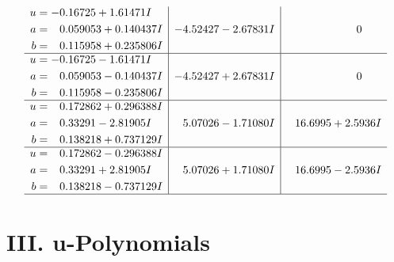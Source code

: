 \documentclass[1p]{elsarticle_modified}
\theoremstyle{definition}
\begin{document}
$$\begin{array}{c|c|c}
\begin{aligned}
u &= -0.16725 + 1.61471 I \\
a &= \phantom{-}0.059053 + 0.140437 I \\
b &= \phantom{-}0.115958 + 0.235806 I\end{aligned}
 & -4.52427 - 2.67831 I & \phantom{-0.000000 } 0 \\ \hline\begin{aligned}
u &= -0.16725 - 1.61471 I \\
a &= \phantom{-}0.059053 - 0.140437 I \\
b &= \phantom{-}0.115958 - 0.235806 I\end{aligned}
 & -4.52427 + 2.67831 I & \phantom{-0.000000 } 0 \\ \hline\begin{aligned}
u &= \phantom{-}0.172862 + 0.296388 I \\
a &= \phantom{-}0.33291 - 2.81905 I \\
b &= \phantom{-}0.138218 + 0.737129 I\end{aligned}
 & \phantom{-}5.07026 - 1.71080 I & \phantom{-}16.6995 + 2.5936 I \\ \hline\begin{aligned}
u &= \phantom{-}0.172862 - 0.296388 I \\
a &= \phantom{-}0.33291 + 2.81905 I \\
b &= \phantom{-}0.138218 - 0.737129 I\end{aligned}
 & \phantom{-}5.07026 + 1.71080 I & \phantom{-}16.6995 - 2.5936 I\\
 \hline 
 \end{array}$$\newpage
\newpage\renewcommand{\arraystretch}{1}
\centering \section*{ III. u-Polynomials}
\end{document}

